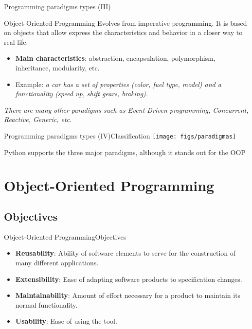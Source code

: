 \documentclass[10pt,compress]{beamer} %
\begin{document}
\begin{frame}{Programming paradigms types (III)}{}
	\begin{block}{Object-Oriented Programming}
		Evolves from imperative programming. It is based on \alert{objects} that allow express the \alert{characteristics} and \alert{behavior} in a closer way to real life. 
  	\end{block}
  	\begin{itemize}
  		\item \textbf{Main characteristics}: abstraction, encapsulation, polymorphism, inheritance, modularity, etc.
		\item Example: \textit{a car has a set of properties (color, fuel type, model) and a functionality (speed up, shift gears, braking).} 
  	\end{itemize}
  	
\textit{\alert{There are many other paradigms such as Event-Driven programming, Concurrent, Reactive, Generic, etc.}}
\end{frame}

\begin{frame}{Programming paradigms types (IV)}{Classification}
	\texttt{[image: figs/paradigmas]}
	
	\centering Python supports the three major paradigms, although it stands out for the OOP
\end{frame}

\section[Object-Oriented Programming]{Object-Oriented Programming}

\subsection{Objectives}

\begin{frame}{Object-Oriented Programming}{Objectives}
\begin{itemize}
  	\item \textbf{Reusability}: Ability of software elements to serve for the construction of many different applications.
  	\item \textbf{Extensibility}: Ease of adapting software products to specification changes.
  	\item \textbf{Maintainability}: Amount of effort necessary for a product to maintain its normal functionality.   
  	\item \textbf{Usability}: Ease of using the tool.
  	\end{itemize} 	
\end{frame}
\end{document}
